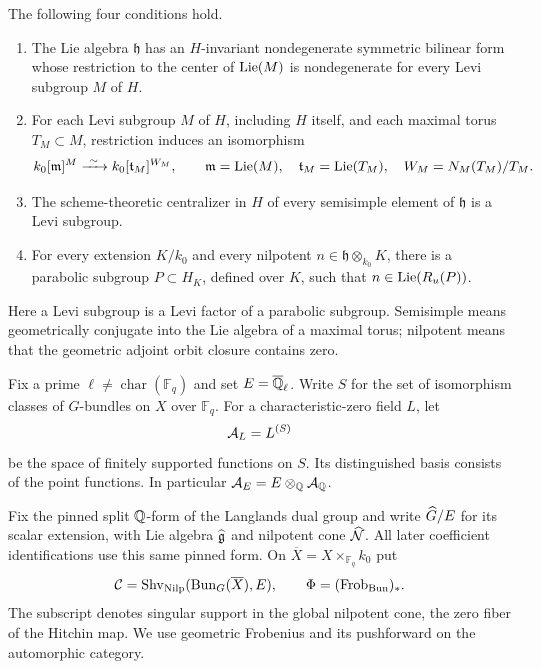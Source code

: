 \begin{assumption}\label{intro:characteristic}
The following four conditions hold.
\begin{enumerate}[label=\textup{(\roman*)}]
\item The Lie algebra $\mathfrak h$ has an $H$-invariant nondegenerate
symmetric bilinear form whose restriction to the center of $\operatorname{Lie}(M)$ is
nondegenerate for every Levi subgroup $M$ of $H$.
\item For each Levi subgroup $M$ of $H$, including $H$ itself, and each
maximal torus $T_M\subset M$, restriction induces an isomorphism
\[
k_0[\mathfrak m]^M\xrightarrow{\ \sim\ }
k_0[\mathfrak t_M]^{W_M},\qquad
\mathfrak m=\operatorname{Lie}(M),\quad \mathfrak t_M=\operatorname{Lie}(T_M),\quad
W_M=N_M(T_M)/T_M.
\]
\item The scheme-theoretic centralizer in $H$ of every semisimple element
of $\mathfrak h$ is a Levi subgroup.
\item For every extension $K/k_0$ and every nilpotent
$n\in\mathfrak h\otimes_{k_0}K$, there is a parabolic subgroup
$P\subset H_K$, defined over $K$, such that
$n\in\operatorname{Lie}(R_u(P))$.
\end{enumerate}
Here a Levi subgroup is a Levi factor of a parabolic subgroup. Semisimple
means geometrically conjugate into the Lie algebra of a maximal torus;
nilpotent means that the geometric adjoint orbit closure contains zero.
\end{assumption}

Fix a prime $\ell\ne\operatorname{char}(\mathbb F_q)$ and set $E=\overline{\mathbb Q}_{\ell}$.
Write $S$ for the set of isomorphism classes of $G$-bundles on $X$ over
$\mathbb F_q$. For a characteristic-zero field $L$, let
\[
\mathcal A_L=L^{(S)}
\]
be the space of finitely supported functions on $S$. Its distinguished
basis consists of the point functions. In particular
$\mathcal A_E=E\otimes_\mathbb Q\mathcal A_\mathbb Q$.

Fix the pinned split $\mathbb Q$-form of the Langlands dual group and write
$\widehat G/E$ for its scalar extension, with Lie algebra $\widehat{\mathfrak g}$
and nilpotent cone $\widehat{\mathcal N}$. All later coefficient identifications use
this same pinned form. On
$\overline X=X\times_{\mathbb F_q}k_0$ put
\[
\mathcal C=\operatorname{Shv}_{\operatorname{Nilp}}(\operatorname{Bun}_G(\overline X),E),\qquad
\Phi=(\mathrm{Frob}_{\operatorname{Bun}})_*.
\]
The subscript denotes singular support in the global nilpotent cone, the
zero fiber of the Hitchin map. We use geometric Frobenius and its
pushforward on the automorphic category.

